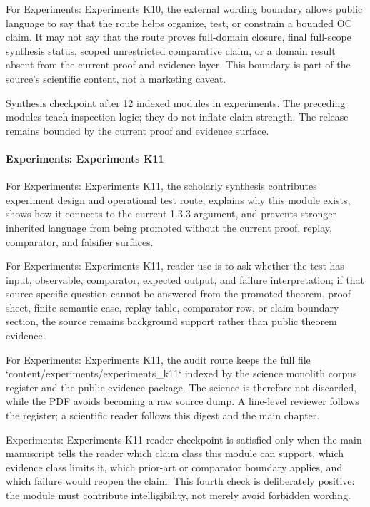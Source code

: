 For Experiments: Experiments K10, the external wording boundary allows public language to say that the route helps organize, test, or constrain a bounded OC claim. It may not say that the route proves full-domain closure, final full-scope synthesis status, scoped unrestricted comparative claim, or a domain result absent from the current proof and evidence layer. This boundary is part of the source's scientific content, not a marketing caveat.


Synthesis checkpoint after 12 indexed modules in experiments. The preceding modules teach inspection logic; they do not inflate claim strength. The release remains bounded by the current proof and evidence surface.


\paragraph{Experiments: Experiments K11}

For Experiments: Experiments K11, the scholarly synthesis contributes experiment design and operational test route, explains why this module exists, shows how it connects to the current 1.3.3 argument, and prevents stronger inherited language from being promoted without the current proof, replay, comparator, and falsifier surfaces.


For Experiments: Experiments K11, reader use is to ask whether the test has input, observable, comparator, expected output, and failure interpretation; if that source-specific question cannot be answered from the promoted theorem, proof sheet, finite semantic case, replay table, comparator row, or claim-boundary section, the source remains background support rather than public theorem evidence.


For Experiments: Experiments K11, the audit route keeps the full file `content/experiments/experiments\_k11` indexed by the science monolith corpus register and the public evidence package. The science is therefore not discarded, while the PDF avoids becoming a raw source dump. A line-level reviewer follows the register; a scientific reader follows this digest and the main chapter.


Experiments: Experiments K11 reader checkpoint is satisfied only when the main manuscript tells the reader which claim class this module can support, which evidence class limits it, which prior-art or comparator boundary applies, and which failure would reopen the claim. This fourth check is deliberately positive: the module must contribute intelligibility, not merely avoid forbidden wording.


